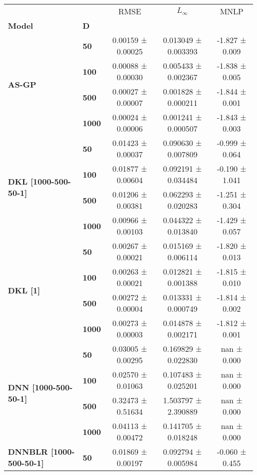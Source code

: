 \begin{tabular}{llccc}
\toprule
      &      &               RMSE &           $L_\infty$ &            MNLP \\
\textbf{Model} & \textbf{D} &                    &                      &                 \\
\midrule
\multirow{4}{*}{\textbf{AS-GP}} & \textbf{50  } &  0.00159 ± 0.00025 &  0.013049 ± 0.003393 &  -1.827 ± 0.009 \\
      & \textbf{100 } &  0.00088 ± 0.00030 &  0.005433 ± 0.002367 &  -1.838 ± 0.005 \\
      & \textbf{500 } &  0.00027 ± 0.00007 &  0.001828 ± 0.000211 &  -1.844 ± 0.001 \\
      & \textbf{1000} &  0.00024 ± 0.00006 &  0.001241 ± 0.000507 &  -1.843 ± 0.003 \\
\cline{1-5}
\multirow{4}{*}{\textbf{DKL [1000-500-50-1]}} & \textbf{50  } &  0.01423 ± 0.00037 &  0.090630 ± 0.007809 &  -0.999 ± 0.064 \\
      & \textbf{100 } &  0.01877 ± 0.00604 &  0.092191 ± 0.034484 &  -0.190 ± 1.041 \\
      & \textbf{500 } &  0.01206 ± 0.00381 &  0.062293 ± 0.020283 &  -1.251 ± 0.304 \\
      & \textbf{1000} &  0.00966 ± 0.00103 &  0.044322 ± 0.013840 &  -1.429 ± 0.057 \\
\cline{1-5}
\multirow{4}{*}{\textbf{DKL [1]}} & \textbf{50  } &  0.00267 ± 0.00021 &  0.015169 ± 0.006114 &  -1.820 ± 0.013 \\
      & \textbf{100 } &  0.00263 ± 0.00021 &  0.012821 ± 0.001388 &  -1.815 ± 0.010 \\
      & \textbf{500 } &  0.00272 ± 0.00004 &  0.013331 ± 0.000749 &  -1.814 ± 0.002 \\
      & \textbf{1000} &  0.00273 ± 0.00003 &  0.014878 ± 0.002171 &  -1.812 ± 0.001 \\
\cline{1-5}
\multirow{4}{*}{\textbf{DNN [1000-500-50-1]}} & \textbf{50  } &  0.03005 ± 0.00295 &  0.169829 ± 0.022830 &     nan ± 0.000 \\
      & \textbf{100 } &  0.02570 ± 0.01063 &  0.107483 ± 0.025201 &     nan ± 0.000 \\
      & \textbf{500 } &  0.32473 ± 0.51634 &  1.503797 ± 2.390889 &     nan ± 0.000 \\
      & \textbf{1000} &  0.04113 ± 0.00472 &  0.141705 ± 0.018248 &     nan ± 0.000 \\
\cline{1-5}
\multirow{4}{*}{\textbf{DNNBLR [1000-500-50-1]}} & \textbf{50  } &  0.01869 ± 0.00197 &  0.092794 ± 0.005984 &  -0.060 ± 0.455 \\

\end{tabular}
